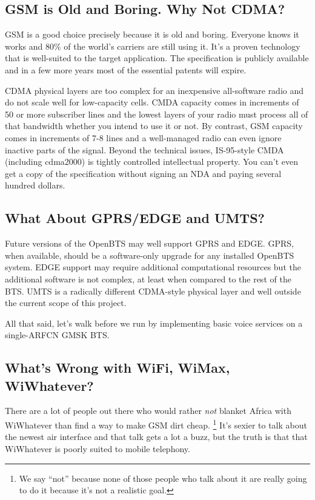 \documentclass[11pt]{book}
\begin{document}
\subsection{GSM is Old and Boring.  Why Not CDMA?}
GSM is a good choice precisely because it is old and boring.  Everyone knows it works and 80\% of the world's carriers are still using it.  It's a proven technology that is well-suited to the target application.  The specification is publicly available and in a few more years most of the essential patents will expire.

CDMA physical layers are too complex for an inexpensive all-software radio and do not scale well for low-capacity cells. CMDA capacity comes in increments of 50 or more subscriber lines and the lowest layers of your radio must process all of that bandwidth whether you intend to use it or not. By contrast, GSM capacity comes in increments of 7-8 lines and a well-managed radio can even ignore inactive parts of the signal.  Beyond the technical issues, IS-95-style CMDA (including cdma2000) is tightly controlled intellectual property. You can't even get a copy of the specification without signing an NDA and paying several hundred dollars.

\subsection{What About GPRS/EDGE and UMTS?}
Future versions of the OpenBTS may well support GPRS and EDGE. GPRS, when available, should be a software-only upgrade for any installed OpenBTS system. EDGE support may require additional computational resources but the additional software is not complex, at least when compared to the rest of the BTS.  UMTS is a radically different CDMA-style physical layer and well outside the current scope of this project.

All that said, let's walk before we run by implementing basic voice services on a single-ARFCN GMSK BTS.

\subsection{What's Wrong with WiFi, WiMax, WiWhatever?}
There are a lot of people out there who would rather \emph{not} blanket Africa with WiWhatever than find a way to make GSM dirt cheap.%
\footnote{We say ``not'' because none of those people who talk about it are really going to do it because it's not a realistic goal.}
It's sexier to talk about the newest air interface and that talk gets a lot a buzz, but the truth is that that WiWhatever is poorly suited to mobile telephony.
\end{document}
